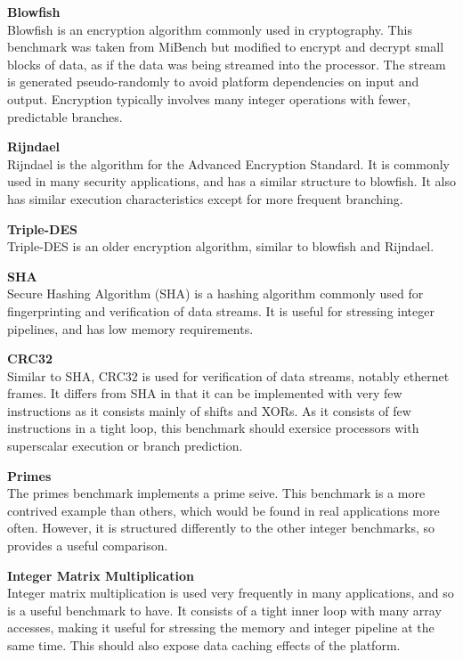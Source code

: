 \documentclass[twocolumn]{article}
\begin{document}
\vspace{3mm}
\textbf{Blowfish}\\
Blowfish is an encryption algorithm commonly used in cryptography. This benchmark was taken from MiBench but modified to encrypt and decrypt small blocks of data, as if the data was being streamed into the processor. The stream is generated pseudo-randomly to avoid platform dependencies on input and output. Encryption typically involves many integer operations with fewer, predictable branches.

\vspace{3mm}
\textbf{Rijndael}\\
Rijndael is the algorithm for the Advanced Encryption Standard. It is commonly used in many security applications, and has a similar structure to blowfish. It also has similar execution characteristics except for more frequent branching.

\vspace{3mm}
\textbf{Triple-DES}\\
Triple-DES is an older encryption algorithm, similar to blowfish and Rijndael.

\vspace{3mm}
\textbf{SHA}\\
Secure Hashing Algorithm (SHA) is a hashing algorithm commonly used for fingerprinting and verification of data streams. It is useful for stressing integer pipelines, and has low memory requirements.

\vspace{3mm}
\textbf{CRC32}\\
Similar to SHA, CRC32 is used for verification of data streams, notably ethernet frames. It differs from SHA in that it can be implemented with very few instructions as it consists mainly of shifts and XORs. As it consists of few instructions in a tight loop, this benchmark should exersice processors with superscalar execution or branch prediction.

\vspace{3mm}
\textbf{Primes}\\
The primes benchmark implements a prime seive. This benchmark is a more contrived example than others, which would be found in real applications more often. However, it is structured differently to the other integer benchmarks, so provides a useful comparison.

\vspace{3mm}
\textbf{Integer Matrix Multiplication}\\
Integer matrix multiplication is used very frequently in many applications, and so is a useful benchmark to have. It consists of a tight inner loop with many array accesses, making it useful for stressing the memory and integer pipeline at the same time. This should also expose data caching effects of the platform.
\end{document}
